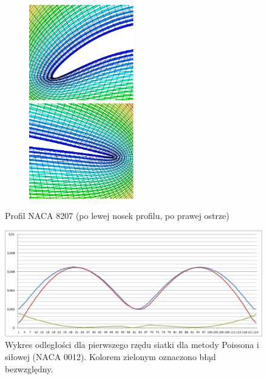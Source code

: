 \begin{figure}[h]
	\begin{subfigure}[h]{\textwidth}
    	\includegraphics[width=0.5\textwidth]{Rysunki/NACA_8207_nosek_poisson}  
    	\quad      
    	\includegraphics[width=0.5\textwidth]{Rysunki/NACA_8207_ostrze_poisson}		
	\end{subfigure}
	\caption{Profil NACA 8207 (po lewej nosek profilu, po prawej ostrze)}
\end{figure}

\begin{figure}[b] 
	\includegraphics[trim = 30mm 0mm 0mm 0mm, width=1.1\linewidth]{Rysunki/NACA_0012_wykres_odleglosci.png}
	\caption{Wykres odległości dla pierwszego rzędu siatki dla metody \colorbox{red!30}{Poissona} i \colorbox{blue!30}{siłowej} (NACA 0012). Kolorem zielonym oznaczono \colorbox{green!30}{błąd bezwzględny}.}
	\label{fig:graph_NACA_0012}
\end{figure}

